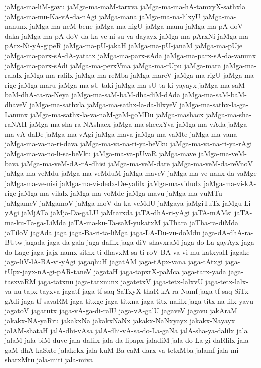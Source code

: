 {jaMga-ma-liM-gavu
jaMga-ma-maM-tarxva
jaMga-ma-ma-hA-tamxyX-sathxla
jaMga-ma-mu-Ka-vA-da-nAgi
jaMga-mana
jaMga-ma-na-lilxyU
jaMga-ma-nanunx
jaMga-ma-neM-bene
jaMga-ma-nigU
jaMga-manu
jaMga-ma-pA-doV-daka
jaMga-ma-pA-doV-da-ka-ve-ni-su-va-dayayx
jaMga-ma-pArxNi
jaMga-ma-pArx-Ni-yA-gipeR
jaMga-ma-pU-jakaH
jaMga-ma-pU-janaM
jaMga-ma-pUje
jaMga-ma-parx-sA-dA-yatatx
jaMga-ma-parx-sAda
jaMga-ma-parx-sA-da-vanunx
jaMga-ma-parx-sAdi
jaMga-ma-perxVma
jaMga-ma-rUpu
jaMga-mara
jaMga-ma-ralalx
jaMga-ma-ralilx
jaMga-ma-reMba
jaMga-mareV
jaMga-ma-rigU
jaMga-ma-rige
jaMga-maru
jaMga-ma-sU-taki
jaMga-ma-sU-ta-ki-yayayx
jaMga-ma-saM-baM-dhA-ca-ra-Neya
jaMga-ma-saM-baM-dha-diM-dAda
jaMga-ma-saM-baM-dhaveV
jaMga-ma-sathxla
jaMga-ma-sathx-la-da-lilxyeV
jaMga-ma-sathx-la-ga-Lanunx
jaMga-ma-sathx-la-va-naM-gaM-goMDu
jaMga-mashacx
jaMga-ma-sha-raNAH
jaMga-ma-sha-ra-NAshacx
jaMga-ma-shecxYva
jaMga-ma-vAda
jaMga-ma-vA-daDe
jaMga-ma-vAgi
jaMga-mava
jaMga-ma-vaMte
jaMga-ma-vana
jaMga-ma-va-na-ri-dava
jaMga-ma-va-na-ri-ya-beVku
jaMga-ma-va-na-ri-ya-rAgi
jaMga-ma-va-no-li-sa-beVku
jaMga-ma-va-pUvaR
jaMga-mave
jaMga-ma-veM-bava
jaMga-ma-veM-dA-rA-dhisi
jaMga-ma-veM-dare
jaMga-ma-veM-da-reVnoV
jaMga-ma-veMdu
jaMga-ma-veMduM
jaMga-maveV
jaMga-ma-ve-nanx-da-vaMge
jaMga-ma-ve-nisi
jaMga-ma-vi-dedx-De-yalilx
jaMga-ma-vidudx
jaMga-ma-vi-kA-rige
jaMga-ma-vilalx
jaMga-ma-voMde
jaMga-mavu
jaMga-ma-vuMTu
jaMgameV
jaMgamoV
jaMga-moV-da-ka-veMdU
jaMgaya
jaMgiTuTx
jaMgu-Li-yAgi
jaMjATa
jaMja-Da-gaLU
jaMtarxda
jaTA-dhA-ri-yAgi
jaTA-mAMsi
jaTA-ma-ku-Ta-ga-LiMda
jaTA-ma-ku-Ta-saM-yukatxM
jaThara
jaTha-ra-diMda
jaTiloV
jagAda
jaga
jaga-Ba-ri-ta-liMga
jaga-LA-Du-vu-doMdu
jaga-dA-dhA-ra-BUtw
jagada
jaga-da-gala
jaga-dalilx
jaga-diV-shavxraM
jaga-do-La-gayAyx
jaga-do-Lage
jaga-jajx-namx-sithx-ti-dhavxM-sa-ti-roV-BA-va-vi-mu-katxyaH
jagake
jaga-liV-lA-BA-vi-yAgi
jagaqhuH
jagatAM
jaga-tApx-vana
jaga-tAtxgi
jaga-tUpx-jayx-nA-gi-pAR-taneV
jagataH
jaga-tapxrX-paMca
jaga-tarx-yada
jaga-tasxvaRM
jaga-tatxnu
jaga-tatxnunx
jagatetxV
jaga-tetx-lalxvU
jaga-tetx-lalx-va-nu-tapx-tayxva
jagatf
jaga-tf-saq-SaTxyX-thaR-kA-ra-Namf
jaga-tf-saq-SiTx-gAdi
jaga-tf-savaRM
jaga-titxge
jaga-titxna
jaga-titx-nalilx
jaga-titx-na-lilx-yavu
jagatoV
jagatutx
jaga-vA-ga-di-ralU
jaga-vA-galU
jagaveV
jagavu
jakAraM
jakakx-NA-yaRru
jakakxNa
jakakxNaNx
jakakx-NaNxyayx
jakakx-Nayayx
jalAM-shataH
jalA-dhi-vAsa
jalA-dhi-vA-sa-do-La-gaNa
jalA-sha-ya-dalilx
jala
jalaM
jala-biM-duve
jala-dalilx
jala-da-lipapx
jaladiM
jala-do-La-gi-daRlilx
jala-gaM-dhA-kaSxte
jalakekx
jala-kuM-Ba-caM-darx-va-tetxMba
jalamf
jala-mi-sharxMtu
jala-miti
jala-miva
}
